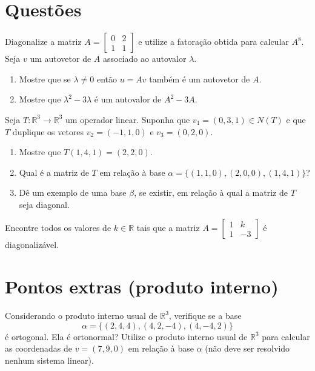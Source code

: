 \documentclass[12pt,a4paper]{article}
\newcommand{\fixme}{{\color{red}(...)}}
\newcommand*\R{\mathbb{R}}
\begin{document}
\section*{Questões}
\begin{ExerciseList}
\Exercise[title={2,5}] Diagonalize a matriz $A = \begin{bmatrix}
0 & 2 \\ 1 & 1
\end{bmatrix}$ e utilize a fatoração obtida para calcular $A^8$.
\Answer \fixme
\Exercise[title={2,5}] Seja $v$ um autovetor de $A$ associado ao autovalor $\lambda$.
\begin{enumerate}
\item Mostre que se $\lambda \neq 0$ então $u=Av$ também é um autovetor de $A$.
\item Mostre que $\lambda^2 - 3\lambda$ é um autovalor de $A^2 - 3A$.
\end{enumerate}

\Answer \fixme
\Exercise[title={2,5}] Seja $T: \R^3 \to \R^3$ um operador linear. Suponha que $v_1 = (0,3,1) \in N(T)$ e que $T$ duplique os vetores $v_2 = (-1,1,0)$ e $v_3 = (0,2,0)$.
\begin{enumerate}
\item Mostre que $T(1,4,1) = (2,2,0)$.
\item Qual é a matriz de $T$ em relação à base $\alpha = \{ (1,1,0), (2,0,0), (1,4,1) \}$?
\item Dê um exemplo de uma base $\beta$, se existir, em relação à qual a matriz de $T$ seja diagonal.
\end{enumerate}

\Answer \fixme
\Exercise[title={2,5}] Encontre todos os valores de $k \in \R$ tais que a matriz $A = \begin{bmatrix}
1 & k \\ 1 & -3
\end{bmatrix}$ é diagonalizável.
\Answer \fixme
\end{ExerciseList}

\section*{Pontos extras (produto interno)}
\begin{ExerciseList}
\Exercise[title={1,5}] Considerando o produto interno usual de $\R^3$, verifique se a base
\[
\alpha = \{ (2,4,4), (4,2,-4), (4,-4,2)\}
\]
é ortogonal. Ela é ortonormal?
\Answer \fixme
\Exercise[title={1,5}] Utilize o produto interno usual de $\R^3$ para calcular as coordenadas de $v = (7,9,0)$ em relação à base $\alpha$ (não deve ser resolvido nenhum sistema linear).
\Answer \fixme

\end{ExerciseList}

\end{document}
